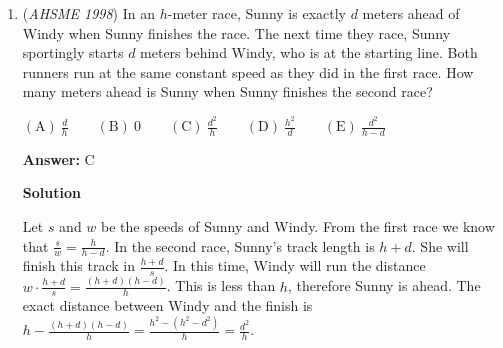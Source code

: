 \begin{enumerate}
 $\textrm{(A)}\ 2 \qquad \textrm{(B)}\ 3 \qquad \textrm{(C)}\ 4 \qquad \textrm{(D)}\ 5 \qquad \textrm{(E)}\ \text{There is not enough information to determine the number.}$

 \textbf{Answer: }C



\textbf{Solution}

Initially, there are the following possibilities for the numbers on the cards: $(1,2,10)$, $(1,3,9)$, $(1,4,8)$, $(1,5,7)$, $(2,3,8)$, $(2,4,7)$, $(2,5,6)$, and $(3,4,6)$.

 If Casey saw the number $3$, she would have known the other two numbers. As she does not, we eliminated the possibility $(3,4,6)$.

 At this moment, if the last card contained a $10$, $9$, or a $6$, Tracy would know the other two numbers. (Note that Tracy is aware of the fact that $(3,4,6)$ was eliminated. If she saw the number $6$, she would know that the other two are $2$ and $5$.) This eliminates three more possibilities.

 Thus before Stacy took her look, we are left with four possible cases: $(2,4,7)$, $(1,4,8)$, $(1,5,7)$, and $(2,3,8)$. As Stacy could not find out the exact combination, the middle number must be $\boxed{4}$.

 


	\item (\textit{AHSME 1998}) In an $h$-meter race, Sunny is exactly $d$ meters ahead of Windy when Sunny finishes the race. The next time they race, Sunny sportingly starts $d$ meters behind Windy, who is at the starting line. Both runners run at the same constant speed as they did in the first race. How many meters ahead is Sunny when Sunny finishes the second race?


 $\mathrm{(A) \ } \frac dh \qquad \mathrm{(B) \ } 0 \qquad \mathrm{(C) \ } \frac {d^2}h \qquad \mathrm{(D) \ } \frac {h^2}d \qquad \mathrm{(E) \ } \frac{d^2}{h-d}$

 \textbf{Answer: }C



\textbf{Solution}

Let $s$ and $w$ be the speeds of Sunny and Windy. From the first race we know that $\frac sw = \frac h{h-d}$. In the second race, Sunny's track length is $h+d$. She will finish this track in $\frac{h+d}s$. In this time, Windy will run the distance $w\cdot \frac{h+d}s = \frac{(h+d)(h-d)}h$. This is less than $h$, therefore Sunny is ahead. The exact distance between Windy and the finish is $h - \frac{(h+d)(h-d)}h = \frac{ h^2 - (h^2-d^2) }h = \boxed{\frac{d^2}h}$.


\end{enumerate}
